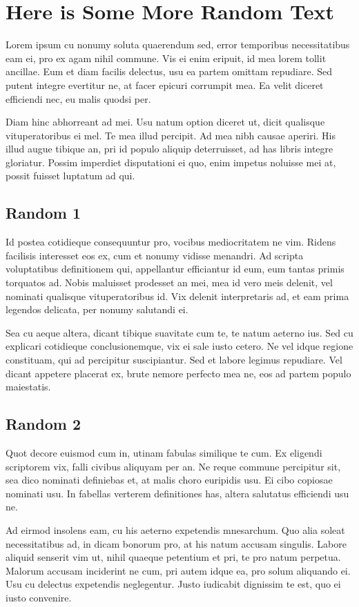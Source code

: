 \chapter{Here is Some More Random Text}

Lorem ipsum cu nonumy soluta quaerendum sed, error temporibus necessitatibus eam ei, pro ex agam nihil commune. Vis ei enim eripuit, id mea lorem tollit ancillae. Eum et diam facilis delectus, usu ea partem omittam repudiare. Sed putent integre evertitur ne, at facer epicuri corrumpit mea. Ea velit diceret efficiendi nec, eu malis quodsi per.

Diam hinc abhorreant ad mei. Usu natum option diceret ut, dicit qualisque vituperatoribus ei mel. Te mea illud percipit. Ad mea nibh causae aperiri. His illud augue tibique an, pri id populo aliquip deterruisset, ad has libris integre gloriatur. Possim imperdiet disputationi ei quo, enim impetus noluisse mei at, possit fuisset luptatum ad qui.
\section{Random 1}
Id postea cotidieque consequuntur pro, vocibus mediocritatem ne vim. Ridens facilisis interesset eos ex, cum et nonumy vidisse menandri. Ad scripta voluptatibus definitionem qui, appellantur efficiantur id eum, eum tantas primis torquatos ad. Nobis maluisset prodesset an mei, mea id vero meis delenit, vel nominati qualisque vituperatoribus id. Vix delenit interpretaris ad, et eam prima legendos delicata, per nonumy salutandi ei.

Sea cu aeque altera, dicant tibique suavitate cum te, te natum aeterno ius. Sed cu explicari cotidieque conclusionemque, vix ei sale iusto cetero. Ne vel idque regione constituam, qui ad percipitur suscipiantur. Sed et labore legimus repudiare. Vel dicant appetere placerat ex, brute nemore perfecto mea ne, eos ad partem populo maiestatis.
\section{Random 2}
Quot decore euismod cum in, utinam fabulas similique te cum. Ex eligendi scriptorem vix, falli civibus aliquyam per an. Ne reque commune percipitur sit, sea dico nominati definiebas et, at malis choro euripidis usu. Ei cibo copiosae nominati usu. In fabellas verterem definitiones has, altera salutatus efficiendi usu ne.

Ad eirmod insolens eam, cu his aeterno expetendis mnesarchum. Quo alia soleat necessitatibus ad, in dicam bonorum pro, at his natum accusam singulis. Labore aliquid senserit vim ut, nihil quaeque petentium et pri, te pro natum perpetua. Malorum accusam inciderint ne cum, pri autem idque ea, pro solum aliquando ei. Usu cu delectus expetendis neglegentur. Justo iudicabit dignissim te est, quo ei iusto convenire.


